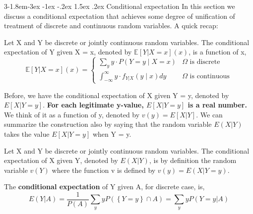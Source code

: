 \documentclass{tufte-handout}
\makeatletter
\renewcommand{\subsection}{\@startsection{subsection}%
    {3}{-1.8em}{-3ex \@plus -1ex \@minus -.2ex}%
    {1.5ex \@plus .2ex}
    {\hspace*{-5.5em}\fcolorbox{ltblue}{ltblue}{\parbox[c][1.0ex][b]{4em}{\phantom{space}}}
    \normalfont\large\itshape\color{ltblue}}}
\makeatother
\begin{document}
    \subsection{Conditional expectation}
    In this section we discuss a conditional expectation that achieves some degree of unification of 
    treatment of discrete and continuous random variables. A quick recap:
    \begin{Definition}
        Let X and Y be discrete or jointly continuous random variables. 
        The conditional expectation of Y given X = x, denoted by $\mathbb{E }[Y|X=x ](x) $,
        is a function of x,
        \[\mathbb{E }[Y|X=x ](x) = 
        \begin{cases}
            \sum_y y \cdot P(Y = y \mid X = x) & \Omega \text{ is discrete} \\
            \int_{-\infty}^{\infty} y \cdot f_{Y|X}(y \mid x) dy & \Omega \text{ is continuous}
            \end{cases}\]
    \end{Definition}

    Before, we have the conditional expectation of X given Y = y, denoted by $ E[X|Y=y] $. \textbf{For each legitimate
    y-value, $ E[X|Y=y] $ is a real number. }We think of it as a function of y, denoted by $ v(y)=E[X|Y] $.
    We can summarize the construction also by saying that the random variable $ E(X|Y) $ takes the value $ E[X|Y=y] $ when Y = y.

    

    \begin{Definition}
        Let X and Y be discrete or jointly continuous random variables. 
        The conditional expectation of X given Y, denoted by $ E(X|Y) $, is by definition the 
        random variable $ v(Y) $ where the function v is defined by $ v(y)=E(X|Y=y ) $.
    \end{Definition}

    \begin{Definition}
        The \textbf{conditional expectation} of Y  given A, for discrete case, is,
        \[E(Y|A ) = \frac{1}{P(A)}\sum_{y }yP(\left\{ Y=y \right\}\cap A)=\sum_{y }yP(Y=y|A)\]
    \end{Definition}
\end{document}
